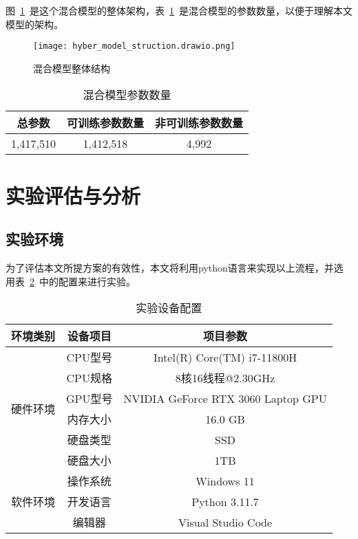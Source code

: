 图~\ref{fig:hyber_model_struct}~是这个混合模型的整体架构，表~\ref{tab:model_params}~是混合模型的参数数量，以便于理解本文模型的架构。
\begin{figure}[htbp]
  \centering
  \texttt{[image: hyber\_model\_struction.drawio.png]}
  \caption{混合模型整体结构}
  \label{fig:hyber_model_struct}
\end{figure}



\begin{table}[htbp]
  \caption{混合模型参数数量}
  \label{tab:model_params}
  \centering
  \begin{tabular}{ccc}
    \toprule
    \textbf{总参数} & \textbf{可训练参数数量} & \textbf{非可训练参数数量}\\
    \midrule
    1,417,510 & 1,412,518 & 4,992\\
    \bottomrule
  \end{tabular}
\end{table}

\section{实验评估与分析}
\subsection{实验环境}
为了评估本文所提方案的有效性，本文将利用python语言来实现以上流程，并选用表~\ref{tab:env_setting}~中的配置来进行实验。

\begin{table}[htbp]
  \caption{实验设备配置}
  \label{tab:env_setting}
  \centering
  \begin{tabular}{ccc}
    \toprule
    \textbf{环境类别} & \textbf{设备项目} & \textbf{项目参数}\\
    \midrule
    \multirow{6}{*}{硬件环境}& CPU型号 & Intel(R) Core(TM) i7-11800H\\
                            & CPU规格 & 8核16线程@2.30GHz\\
                            & GPU型号 & NVIDIA GeForce RTX 3060 Laptop GPU\\
                            & 内存大小& 16.0 GB\\
                            & 硬盘类型& SSD\\
                            & 硬盘大小& 1TB\\
                            \hline
    \multirow{3}{*}{软件环境}&操作系统&Windows 11\\
                            &开发语言&Python 3.11.7\\
                            &编辑器 &Visual Studio Code\\                       
    \bottomrule
  \end{tabular}
\end{table}

